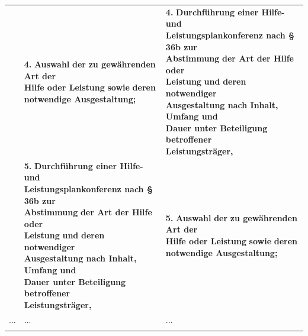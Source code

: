 \documentclass[10pt,a4paper,landscape]{article}
\begin{document}
\begin{longtable}{|L{8.2cm}|L{8.2cm}|L{8.2cm}|}
\hhline{|---|}
 & \textbf{4.} \newline \textbf{\textcolor{diffred}{Auswahl}}\textbf{ der }\textbf{\textcolor{diffred}{zu gewährenden}}\textbf{ Art der  \newline Hilfe oder Leistung }\textbf{\textcolor{diffred}{sowie}}\textbf{ deren} \newline \textbf{\textcolor{diffred}{notwendige Ausgestaltung;}} & \textbf{4.} \newline \textbf{\textcolor{diffgreen}{Durchführung einer Hilfe- und  \newline Leistungsplankonferenz nach \S{} 36b zur  \newline Abstimmung}}\textbf{ der Art der Hilfe oder  \newline Leistung }\textbf{\textcolor{diffgreen}{und}}\textbf{ deren }\textbf{\textcolor{diffgreen}{notwendiger  \newline Ausgestaltung nach Inhalt, Umfang und  \newline Dauer unter Beteiligung betroffener  \newline Leistungsträger,}} \\
\hhline{|---|}
 & \textbf{5.} \newline \textbf{\textcolor{diffred}{Durchführung einer Hilfe- und  \newline Leistungsplankonferenz nach \S{} 36b zur  \newline Abstimmung}}\textbf{ der Art der Hilfe oder  \newline Leistung }\textbf{\textcolor{diffred}{und}}\textbf{ deren }\textbf{\textcolor{diffred}{notwendiger  \newline Ausgestaltung nach Inhalt, Umfang und  \newline Dauer unter Beteiligung betroffener  \newline Leistungsträger,}} & \textbf{5.} \newline \textbf{\textcolor{diffgreen}{Auswahl}}\textbf{ der }\textbf{\textcolor{diffgreen}{zu gewährenden}}\textbf{ Art der  \newline Hilfe oder Leistung }\textbf{\textcolor{diffgreen}{sowie}}\textbf{ deren} \newline \textbf{\textcolor{diffgreen}{notwendige Ausgestaltung;}} \\
\hhline{|---|}
... & ... & ... \\
\hhline{|---|}

\end{longtable}
\end{document}
